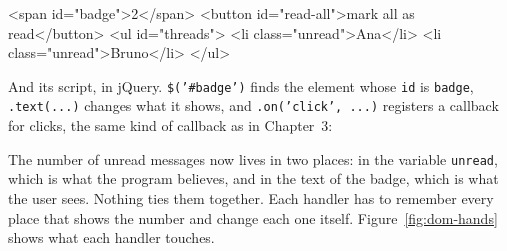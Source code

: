\begin{code}[language={},morestring={[b]"}]
<span id="badge">2</span>
<button id="read-all">mark all as read</button>
<ul id="threads">
  <li class="unread">Ana</li>
  <li class="unread">Bruno</li>
</ul>
\end{code}

And its script, in jQuery. \texttt{\$('\#badge')} finds the element whose
\texttt{id} is \texttt{badge}, \texttt{.text(...)} changes what it shows, and
\texttt{.on('click', ...)} registers a callback for clicks, the same kind of
callback as in Chapter~3:


The number of unread messages now lives in two places: in the variable
\texttt{unread}, which is what the program believes, and in the text of the
badge, which is what the user sees. Nothing ties them together. Each handler
has to remember every place that shows the number and change each one itself.
Figure~\ref{fig:dom-hands} shows what each handler touches.

